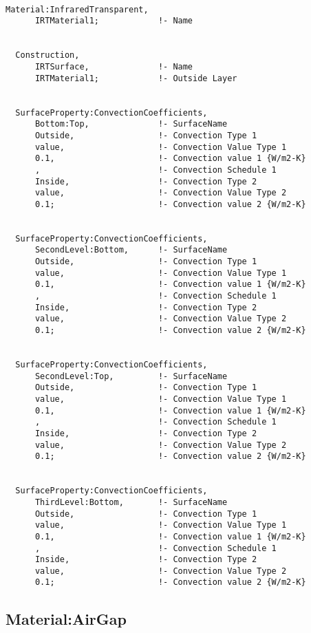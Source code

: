 \begin{lstlisting}

Material:InfraredTransparent,
      IRTMaterial1;            !- Name


  Construction,
      IRTSurface,              !- Name
      IRTMaterial1;            !- Outside Layer


  SurfaceProperty:ConvectionCoefficients,
      Bottom:Top,              !- SurfaceName
      Outside,                 !- Convection Type 1
      value,                   !- Convection Value Type 1
      0.1,                     !- Convection value 1 {W/m2-K}
      ,                        !- Convection Schedule 1
      Inside,                  !- Convection Type 2
      value,                   !- Convection Value Type 2
      0.1;                     !- Convection value 2 {W/m2-K}


  SurfaceProperty:ConvectionCoefficients,
      SecondLevel:Bottom,      !- SurfaceName
      Outside,                 !- Convection Type 1
      value,                   !- Convection Value Type 1
      0.1,                     !- Convection value 1 {W/m2-K}
      ,                        !- Convection Schedule 1
      Inside,                  !- Convection Type 2
      value,                   !- Convection Value Type 2
      0.1;                     !- Convection value 2 {W/m2-K}


  SurfaceProperty:ConvectionCoefficients,
      SecondLevel:Top,         !- SurfaceName
      Outside,                 !- Convection Type 1
      value,                   !- Convection Value Type 1
      0.1,                     !- Convection value 1 {W/m2-K}
      ,                        !- Convection Schedule 1
      Inside,                  !- Convection Type 2
      value,                   !- Convection Value Type 2
      0.1;                     !- Convection value 2 {W/m2-K}


  SurfaceProperty:ConvectionCoefficients,
      ThirdLevel:Bottom,       !- SurfaceName
      Outside,                 !- Convection Type 1
      value,                   !- Convection Value Type 1
      0.1,                     !- Convection value 1 {W/m2-K}
      ,                        !- Convection Schedule 1
      Inside,                  !- Convection Type 2
      value,                   !- Convection Value Type 2
      0.1;                     !- Convection value 2 {W/m2-K}
\end{lstlisting}

\subsection{Material:AirGap}\label{materialairgap}

